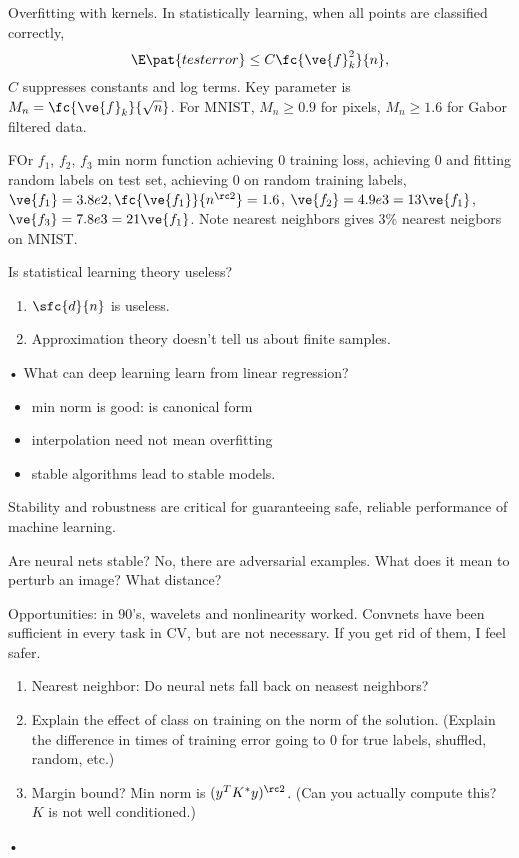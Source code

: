 Overfitting with kernels. In statistically learning, when all points are classified correctly, 
$$
\E\pat{test error}\le C\fc{\ve{f}_k^2}{n},
$$
$C$ suppresses constants and log terms. Key parameter is $M_n = \fc{\ve{f}_k}{\sqrt n}$. %
For MNIST, $M_n\ge 0.9$ for pixels, $M_n\ge 1.6$ for Gabor filtered data.

FOr $f_1$, $f_2$, $f_3$ min norm function achieving 0 training loss, achieving 0 and fitting random labels on test set, achieving 0 on random training labels, $\ve{f_1}=3.8e2, \fc{\ve{f_1}}{n^{\rc 2}}=1.6$, $\ve{f_2}=4.9e3 = 13\ve{f_1}$, $\ve{f_3} = 7.8e3 = 21\ve{f_1}$.
Note nearest neighbors gives 3\% nearest neigbors on MNIST.

Is statistical learning theory useless?
\begin{enumerate}
\item
$\sfc{d}{n}$ is useless.
\item
Approximation theory doesn't tell us about finite samples.
\end{enumerate}•
What can deep learning learn from linear regression?
\begin{itemize}
\item
min norm is good: is canonical form
\item
interpolation need not mean overfitting
\item
stable algorithms lead to stable models.
\end{itemize}
Stability and robustness are critical for guaranteeing safe, reliable performance of machine learning.

Are neural nets stable? No, there are adversarial examples.
What does it mean to perturb an image? What distance?

Opportunities: in 90's, wavelets and nonlinearity worked. Convnets have been sufficient in every task in CV, but are not necessary. If you get rid of them, I feel safer.

\begin{enumerate}
\item
Nearest neighbor: Do neural nets fall back on neasest neighbors? 
\item
Explain the effect of class on training on the norm of the solution. (Explain the difference in times of training error going to 0 for true labels, shuffled, random, etc.)
\item
Margin bound? Min norm is $(y^TK^*y)^{\rc 2}$. (Can you actually compute this? $K$ is not well conditioned.)
\end{enumerate}•

